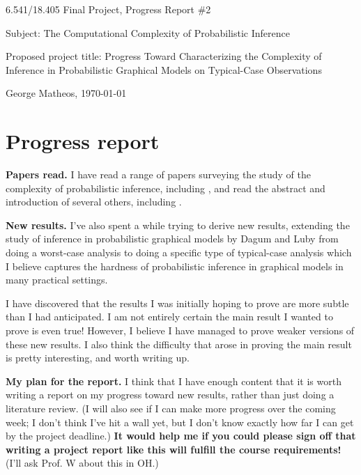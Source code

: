 \documentclass{article}
\begin{document}
\begin{center}
    \Large
    6.541/18.405 Final Project, Progress Report \#2

    \vspace{3pt}
    Subject: The Computational Complexity of Probabilistic Inference

    \vspace{3pt}
    \normalsize Proposed project title: Progress Toward Characterizing the Complexity of Inference in Probabilistic Graphical Models on Typical-Case Observations

    \vspace{3pt}
    \normalsize
    George Matheos, \today
\end{center}

\section{Progress report}
\textbf{Papers read.} I have read a range of papers surveying the study of the complexity of probabilistic inference, including \cite{jerrum1986, cooper1990, dagum1993, dagum1997optimal, ackerman2019computability, kwisthout2018approximate, akmal2022majority, aaronson2014equivalence, freer2010probabilistic}, and read the abstract and introduction of several others, including \cite{feige2002relations, moitra2019approximate, tantau2022satisfaction}.

\medskip
\noindent \textbf{New results.} I've also spent a while trying to derive new results, extending the study of inference in probabilistic graphical models by Dagum and Luby \cite{dagum1993, dagum1997optimal} from doing a worst-case analysis to doing a specific type of typical-case analysis which I believe captures the hardness of probabilistic inference in graphical models in many practical settings.

I have discovered that the results I was initially hoping to prove are more subtle than I had anticipated.
I am not entirely certain the main result I wanted to prove is even true!
However, I believe I have managed to prove weaker versions of these new results.
I also think the difficulty that arose in proving the main result is pretty interesting, and worth writing up.

\medskip
\noindent \textbf{My plan for the report.} I think that I have enough content that it is worth writing a report on my progress toward new results, rather than just doing a literature review.
(I will also see if I can make more progress over the coming week; I don't think I've hit a wall yet, but I don't know exactly how far I can get by the project deadline.)
\textbf{
It would help me if you could please sign off that writing a project report like this will fulfill the course requirements!}
(I'll ask Prof. W about this in OH.)
\end{document}
